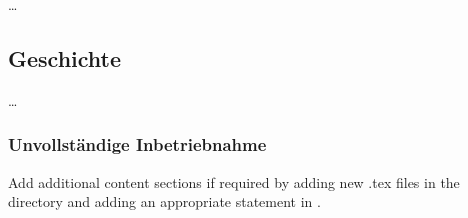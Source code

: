 \dots

\subsection{Geschichte}

\dots

\subsubsection{Unvollständige Inbetriebnahme}

Add additional content sections if required by adding new .tex files in the
 directory and adding an appropriate 
 statement in . 
